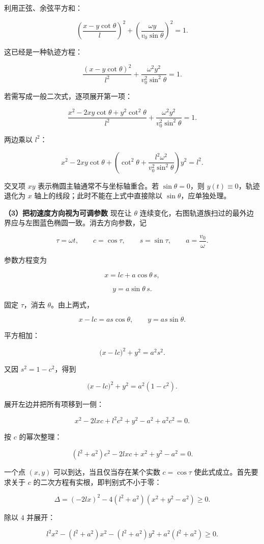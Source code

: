 \documentclass[12pt,a4paper,UTF8]{ctexart}
\begin{document}
利用正弦、余弦平方和：

\[\left(\frac{x-y\cot\theta}{l}\right)^2
+\left(\frac{\omega y}{v_0\sin\theta}\right)^2=1.\]

这已经是一种轨迹方程：

\[\boxed{
\frac{(x-y\cot\theta)^2}{l^2}
+\frac{\omega^2y^2}{v_0^2\sin^2\theta}=1
}.\]

若需写成一般二次式，逐项展开第一项：

\[\frac{x^2-2xy\cot\theta+y^2\cot^2\theta}{l^2}
+\frac{\omega^2y^2}{v_0^2\sin^2\theta}=1.\]

两边乘以 \(l^2\)：

\[\boxed{
x^2-2xy\cot\theta
+\left(\cot^2\theta+\frac{l^2\omega^2}{v_0^2\sin^2\theta}\right)y^2=l^2
}.\]

交叉项 \(xy\) 表示椭圆主轴通常不与坐标轴重合。若 \(\sin\theta=0\)，则
\(y(t)\equiv0\)，轨迹退化为 \(x\) 轴上的线段；此时不能在上式中直接除以
\(\sin\theta\)，应单独处理。

\textbf{（3）把初速度方向视为可调参数} 现在让 \(\theta\)
连续变化，右图轨道族扫过的最外边界应与左图蓝色椭圆一致。消去方向参数，记

\[\tau=\omega t,\qquad c=\cos\tau,\qquad s=\sin\tau,\qquad a=\frac{v_0}{\omega}.\]

参数方程变为

\[x=lc+a\cos\theta\,s,\]

\[y=a\sin\theta\,s.\]

固定 \(\tau\)，消去 \(\theta\)。由上两式，

\[x-lc=a s\cos\theta,\qquad y=a s\sin\theta.\]

平方相加：

\[\bigl(x-lc\bigr)^2+y^2=a^2s^2.\]

又因 \(s^2=1-c^2\)，得到

\[\bigl(x-lc\bigr)^2+y^2=a^2(1-c^2).\]

展开左边并把所有项移到一侧：

\[x^2-2lxc+l^2c^2+y^2-a^2+a^2c^2=0.\]

按 \(c\) 的幂次整理：

\[\boxed{(l^2+a^2)c^2-2lxc+x^2+y^2-a^2=0}.\]

一个点 \((x,y)\) 可以到达，当且仅当存在某个实数 \(c=\cos\tau\)
使此式成立。首先要求关于 \(c\) 的二次方程有实根，即判别式不小于零：

\[\Delta=(-2lx)^2-4(l^2+a^2)(x^2+y^2-a^2)\ge0.\]

除以 \(4\) 并展开：

\[l^2x^2-(l^2+a^2)x^2-(l^2+a^2)y^2+a^2(l^2+a^2)\ge0.\]
\end{document}
